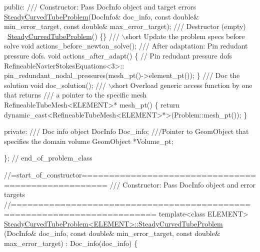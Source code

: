 \begin{DoxyCodeInclude}
\textcolor{keyword}{public}:
\textcolor{comment}{}
\textcolor{comment}{ /// Constructor: Pass DocInfo object and target errors}
\textcolor{comment}{} \hyperlink{classSteadyCurvedTubeProblem}{SteadyCurvedTubeProblem}(DocInfo& doc\_info, \textcolor{keyword}{const} \textcolor{keywordtype}{double}& min\_error\_target,
                  \textcolor{keyword}{const} \textcolor{keywordtype}{double}& max\_error\_target);
\textcolor{comment}{}
\textcolor{comment}{ /// Destructor (empty)}
\textcolor{comment}{} ~\hyperlink{classSteadyCurvedTubeProblem}{SteadyCurvedTubeProblem}() \{\}
\textcolor{comment}{}
\textcolor{comment}{ /// \(\backslash\)short Update the problem specs before solve }
\textcolor{comment}{} \textcolor{keywordtype}{void} actions\_before\_newton\_solve();
\textcolor{comment}{}
\textcolor{comment}{ /// After adaptation: Pin redudant pressure dofs.}
\textcolor{comment}{} \textcolor{keywordtype}{void} actions\_after\_adapt()
  \{
   \textcolor{comment}{// Pin redudant pressure dofs}
   RefineableNavierStokesEquations<3>::
    pin\_redundant\_nodal\_pressures(mesh\_pt()->element\_pt());
  \} 
\textcolor{comment}{}
\textcolor{comment}{ /// Doc the solution}
\textcolor{comment}{} \textcolor{keywordtype}{void} doc\_solution();
\textcolor{comment}{}
\textcolor{comment}{ /// \(\backslash\)short Overload generic access function by one that returns}
\textcolor{comment}{ /// a pointer to the specific  mesh}
\textcolor{comment}{} RefineableTubeMesh<ELEMENT>* mesh\_pt() 
  \{
   \textcolor{keywordflow}{return} \textcolor{keyword}{dynamic\_cast<}RefineableTubeMesh<ELEMENT>*\textcolor{keyword}{>}(Problem::mesh\_pt());
  \}

\textcolor{keyword}{private}:
 \textcolor{comment}{}
\textcolor{comment}{ /// Doc info object}
\textcolor{comment}{} DocInfo Doc\_info;
 \textcolor{comment}{}
\textcolor{comment}{ ///Pointer to GeomObject that specifies the domain volume}
\textcolor{comment}{} GeomObject *Volume\_pt;

\}; \textcolor{comment}{// end\_of\_problem\_class}




\textcolor{comment}{//=start\_of\_constructor===================================================}\textcolor{comment}{}
\textcolor{comment}{/// Constructor: Pass DocInfo object and error targets}
\textcolor{comment}{}\textcolor{comment}{//========================================================================}
\textcolor{keyword}{template}<\textcolor{keyword}{class} ELEMENT>
\hyperlink{classSteadyCurvedTubeProblem_ac276276fa87e57ff486e3af24b72e38b}{SteadyCurvedTubeProblem<ELEMENT>::SteadyCurvedTubeProblem}
      (DocInfo& doc\_info,
                                            \textcolor{keyword}{const} \textcolor{keywordtype}{double}& min\_error\_target,
                                            \textcolor{keyword}{const} \textcolor{keywordtype}{double}& max\_error\_target) 
 : Doc\_info(doc\_info)
\{ 


\end{DoxyCodeInclude}
